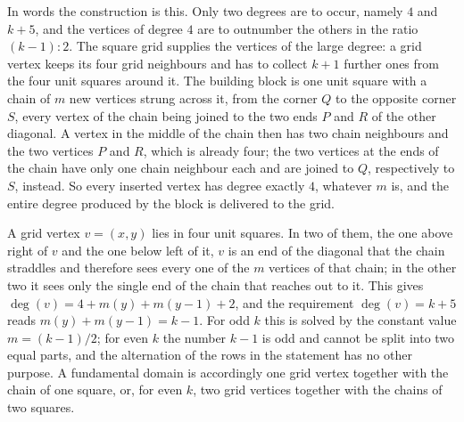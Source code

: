 \documentclass[10pt,a4paper]{article}
\begin{document}
In words the construction is this. Only two degrees are to occur, namely $4$ and $k+5$, and the
vertices of degree $4$ are to outnumber the others in the ratio $(k-1):2$. The square grid supplies
the vertices of the large degree: a grid vertex keeps its four grid neighbours and has to collect
$k+1$ further ones from the four unit squares around it. The building block is one unit square with a
chain of $m$ new vertices strung across it, from the corner $Q$ to the opposite corner $S$, every
vertex of the chain being joined to the two ends $P$ and $R$ of the other diagonal. A vertex in the
middle of the chain then has two chain neighbours and the two vertices $P$ and $R$, which is already
four; the two vertices at the ends of the chain have only one chain neighbour each and are joined to
$Q$, respectively to $S$, instead. So every inserted vertex has degree exactly $4$, whatever $m$ is,
and the entire degree produced by the block is delivered to the grid.

A grid vertex $v=(x,y)$ lies in four unit squares. In two of them, the one above right of $v$ and the
one below left of it, $v$ is an end of the diagonal that the chain straddles and therefore sees every
one of the $m$ vertices of that chain; in the other two it sees only the single end of the chain that
reaches out to it. This gives $\deg (v)=4+m(y)+m(y-1)+2$, and the requirement $\deg (v)=k+5$ reads
$m(y)+m(y-1)=k-1$. For odd $k$ this is solved by the constant value $m=(k-1)/2$; for even $k$ the
number $k-1$ is odd and cannot be split into two equal parts, and the alternation of the rows in the
statement has no other purpose. A fundamental domain is accordingly one grid vertex together with the
chain of one square, or, for even $k$, two grid vertices together with the chains of two squares.

\end{document}
